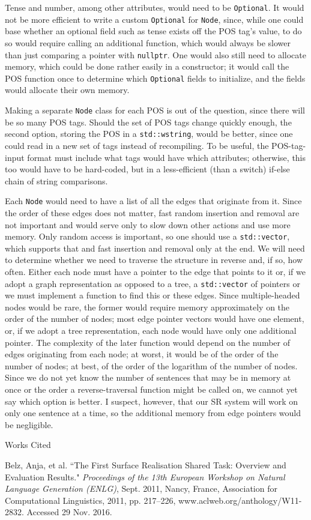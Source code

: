 \documentclass[12pt,letterpaper]{article}
\newenvironment{workscited}{
  \newcommand{\bibentry}{\noindent{}\hangindent=0.5in}
  \newpage{}
  {\centering{}Works Cited\par{}}
}{\newpage{}}
\begin{document}
\begin{flushleft}
  Tense and number, among other attributes, would need to be \texttt{Optional}. It would not be more efficient to write a custom \texttt{Optional} for \texttt{Node}, since, while one could base whether an optional field such as tense exists off the POS tag's value, to do so would require calling an additional function, which would always be slower than just comparing a pointer with \texttt{nullptr}. One would also still need to allocate memory, which could be done rather easily in a constructor; it would call the POS function once to determine which \texttt{Optional} fields to initialize, and the fields would allocate their own memory.

  Making a separate \texttt{Node} class for each POS is out of the question, since there will be so many POS tags. Should the set of POS tags change quickly enough, the second option, storing the POS in a \texttt{std::wstring}, would be better, since one could read in a new set of tags instead of recompiling. To be useful, the POS-tag-input format must include what tags would have which attributes; otherwise, this too would have to be hard-coded, but in a less-efficient (than a switch) if-else chain of string comparisons.

  Each \texttt{Node} would need to have a list of all the edges that originate from it. Since the order of these edges does not matter, fast random insertion and removal are not important and would serve only to slow down other actions and use more memory. Only random access is important, so one should use a \texttt{std::vector}, which supports that and fast insertion and removal only at the end. We will need to determine whether we need to traverse the structure in reverse and, if so, how often. Either each node must have a pointer to the edge that points to it or, if we adopt a graph representation as opposed to a tree, a \texttt{std::vector} of pointers or we must implement a function to find this or these edges. Since multiple-headed nodes would be rare, the former would require memory approximately on the order of the number of nodes; most edge pointer vectors would have one element, or, if we adopt a tree representation, each node would have only one additional pointer. The complexity of the later function would depend on the number of edges originating from each node; at worst, it would be of the order of the number of nodes; at best, of the order of the logarithm of the number of nodes. Since we do not yet know the number of sentences that may be in memory at once or the order a reverse-traversal function might be called on, we cannot yet say which option is better. I suspect, however, that our SR system will work on only one sentence at a time, so the additional memory from edge pointers would be negligible.
  \begin{workscited}
    \bibentry{}Belz, Anja, et al. ``The First Surface Realisation Shared Task: Overview and Evaluation Results." \textit{Proceedings of the 13th European Workshop on Natural Language Generation (ENLG)}, Sept. 2011, Nancy, France, Association for Computational Linguistics, 2011, pp. 217--226, www.aclweb.org/anthology/W11-2832. Accessed 29 Nov. 2016.


\end{workscited}
\end{flushleft}
\end{document}
